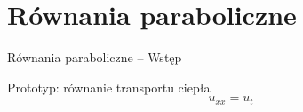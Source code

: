 \section{Równania paraboliczne}

\begin{frame}{Równania paraboliczne -- Wstęp}
  \begin{block}{Prototyp: równanie transportu ciepła}
    \begin{equation}\label{7} u_{x x} = u_t \end{equation}
  \end{block}
\end{frame}
